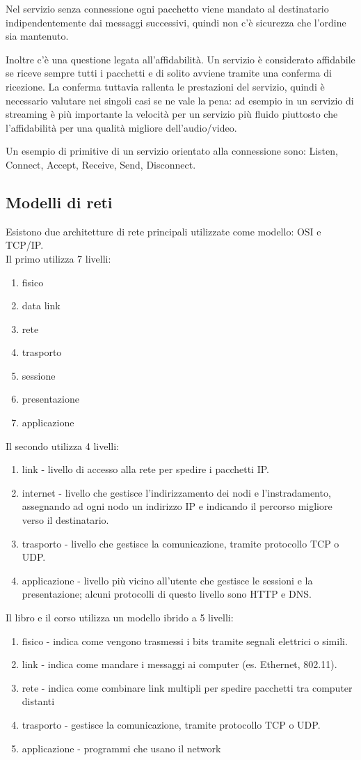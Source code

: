 Nel servizio senza connessione ogni pacchetto viene mandato al destinatario indipendentemente dai messaggi successivi, quindi non c'è sicurezza che l'ordine sia mantenuto. 

Inoltre c'è una questione legata all'affidabilità. 
Un servizio è considerato affidabile se riceve sempre tutti i pacchetti e di solito avviene tramite una conferma di ricezione. 
La conferma tuttavia rallenta le prestazioni del servizio, quindi è necessario valutare nei singoli casi se ne vale la pena: 
ad esempio in un servizio di streaming è più importante la velocità per un servizio più fluido piuttosto che l'affidabilità per una qualità migliore dell'audio/video.

Un esempio di primitive di un servizio orientato alla connessione sono: Listen, Connect, Accept, Receive, Send, Disconnect.

\subsection{Modelli di reti}
Esistono due architetture di rete principali utilizzate come modello: OSI e TCP/IP. \\
Il primo utilizza 7 livelli:
\begin{enumerate}
\item fisico
\item data link
\item rete
\item trasporto
\item sessione
\item presentazione
\item applicazione
\end{enumerate}
Il secondo utilizza 4 livelli:
\begin{enumerate}
\item link - livello  di accesso alla rete per spedire i pacchetti IP.
\item internet - livello che gestisce l'indirizzamento dei nodi e l'instradamento, assegnando ad ogni nodo un indirizzo IP e indicando il percorso migliore verso il destinatario.
\item trasporto - livello che gestisce la comunicazione, tramite protocollo TCP o UDP.
\item applicazione - livello più vicino all'utente che gestisce le sessioni e la presentazione; alcuni protocolli di questo livello sono HTTP e DNS.
\end{enumerate}
Il libro e il corso utilizza un modello ibrido a 5 livelli:
\begin{enumerate}
\item fisico - indica come vengono trasmessi i bits tramite segnali elettrici o simili.
\item link - indica come mandare i messaggi ai computer (es. Ethernet, 802.11).
\item rete - indica come combinare link multipli per spedire pacchetti tra computer distanti
\item trasporto - gestisce la comunicazione, tramite protocollo TCP o UDP.
\item applicazione - programmi che usano il network
\end{enumerate}

